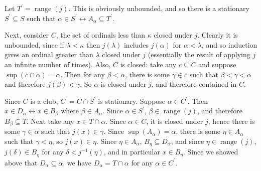 \documentclass[12pt]{article}
\begin{document}
Let $T^\prime=\operatorname{range}(j)$.  This is obviously unbounded, and so there is a stationary $S^\prime\subseteq S$ such that $\alpha\in S^\prime\leftrightarrow A_\alpha\subseteq T^\prime$.

Next, consider $C$, the set of ordinals less than $\kappa$ closed under $j$.  Clearly it is unbounded, since if $\lambda<\kappa$ then $j(\lambda)$ includes $j(\alpha)$ for $\alpha<\lambda$, and so induction gives an ordinal greater than $\lambda$ closed under $j$ (essentially the result of applying $j$ an infinite number of times).  Also, $C$ is closed: take any $c\subseteq C$ and suppose $\operatorname{sup}(c\cap\alpha)=\alpha$.  Then for any $\beta<\alpha$, there is some $\gamma\in c$ such that $\beta<\gamma<\alpha$ and therefore $j(\beta)<\gamma$.  So $\alpha$ is closed under $j$, and therefore contained in $C$.

Since $C$ is a club, $C^\prime=C\cap S^\prime$ is stationary.  Suppose $\alpha\in C^\prime$.  Then $x\in D_\alpha\leftrightarrow x\in B_\beta$ where $\beta\in A_\alpha$.  Since $\alpha\in S^\prime$, $\beta\in\operatorname{range}(j)$, and therefore $B_\beta\subseteq T$.  Next take any $x\in T\cap\alpha$.  Since $\alpha\in C$, it is closed under $j$, hence there is some $\gamma\in\alpha$ such that $j(x)\in\gamma$.  Since $\operatorname{sup}(A_\alpha)=\alpha$, there is some $\eta\in A_\alpha$ such that $\gamma<\eta$, so $j(x)\in\eta$.  Since $\eta\in A_\alpha$, $B_\eta\subseteq D_\alpha$, and since $\eta\in\operatorname{range}(j)$, $j(\delta)\in B_\eta$ for any $\delta<j^{-1}(\eta)$, and in particular $x\in B_\eta$.  Since we showed above that $D_\alpha\subseteq\alpha$, we have $D_\alpha=T\cap\alpha$ for any $\alpha\in C^\prime$.
\end{document}
